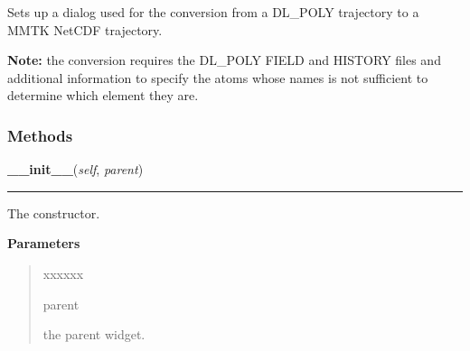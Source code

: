 Sets up a dialog used for the conversion from a DL\_POLY trajectory to a 
MMTK NetCDF trajectory.

\textbf{Note:} the conversion requires the DL\_POLY FIELD and HISTORY files and additional
information to specify the atoms whose names is not sufficient to determine
which element they are.





  \subsubsection{Methods}

    \label{nMOLDYN:GUI:TrajectoryConversionDialog:DL_POLYConverterDialog:__init__}

    \vspace{0.5ex}

\hspace{.8\funcindent}\begin{boxedminipage}{\funcwidth}

    \raggedright \textbf{\_\_init\_\_}(\textit{self}, \textit{parent})

    \vspace{-1.5ex}

    \rule{\textwidth}{0.5\fboxrule}
\setlength{\parskip}{2ex}
    The constructor.

\setlength{\parskip}{1ex}
      \textbf{Parameters}
      \vspace{-1ex}

      \begin{quote}
        \begin{Ventry}{xxxxxx}

          \item[parent]

          the parent widget.

        \end{Ventry}

      \end{quote}

    \end{boxedminipage}

